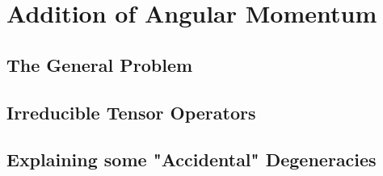 \chapter{Addition of Angular Momentum}
\section{The General Problem}

\section{Irreducible Tensor Operators}

\section{Explaining some "Accidental" Degeneracies}
